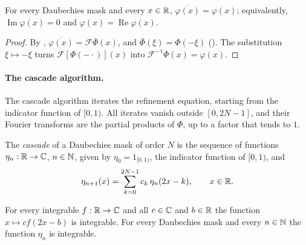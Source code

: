 \begin{proposition}
\label{prop:daub-scaling-real}
\leanok
{}
For every Daubechies mask and every $x \in \mathbb{R}$, $\overline{\varphi(x)} = \varphi(x)$;
equivalently, $\operatorname{Im} \varphi(x) = 0$ and $\varphi(x) = \operatorname{Re} \varphi(x)$.
\end{proposition}

\begin{proof}
\leanok
{}
By , $\overline{\varphi(x)} = \mathcal F \bar\Phi(x)$, and
$\bar\Phi(\xi) = \Phi(-\xi)$ (). The substitution
$\xi \mapsto -\xi$ turns $\mathcal F[\Phi(-\cdot)](x)$ into
$\mathcal F^{-1} \Phi(x) = \varphi(x)$.
\end{proof}

\paragraph{The cascade algorithm.}
The cascade algorithm iterates the refinement equation, starting from the indicator function of
$[0, 1)$. All iterates vanish outside $[0, 2N - 1]$, and their Fourier transforms are the
partial products of $\Phi$, up to a factor that tends to $1$.

\begin{definition}
\label{def:daub-cascade}
\leanok
{}
The \emph{cascade} of a Daubechies mask of order $N$ is the sequence of functions
$\eta_n : \mathbb{R} \to \mathbb{C}$, $n \in \mathbb{N}$, given by $\eta_0 = 1_{[0, 1)}$, the indicator function of
$[0, 1)$, and
\[
  \eta_{n+1}(x) = \sum_{k=0}^{2N-1} c_k \, \eta_n(2x - k) , \qquad x \in \mathbb{R} .
\]
\end{definition}

\begin{lemma}
\label{lem:daub-cascade-integrable}
\leanok
{}
For every integrable $f : \mathbb{R} \to \mathbb{C}$ and all $c \in \mathbb{C}$ and $b \in \mathbb{R}$ the function
$x \mapsto c f(2x - b)$ is integrable. For every Daubechies mask and every $n \in \mathbb{N}$ the
function $\eta_n$ is integrable.
\end{lemma}

